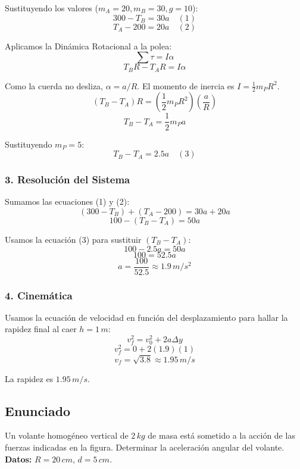 \documentclass[12pt, a4paper]{article}
\begin{document}
Sustituyendo los valores ($m_A=20, m_B=30, g=10$):
$$ 300 - T_B = 30 a \quad (1) $$
$$ T_A - 200 = 20 a \quad (2) $$

Aplicamos la Dinámica Rotacional a la polea:
$$ \sum \tau = I \alpha $$
$$ T_B R - T_A R = I \alpha $$

Como la cuerda no desliza, $\alpha = a/R$. El momento de inercia es $I = \frac{1}{2}m_P R^2$.
$$ (T_B - T_A) R = \left( \frac{1}{2} m_P R^2 \right) \left( \frac{a}{R} \right) $$
$$ T_B - T_A = \frac{1}{2} m_P a $$

Sustituyendo $m_P = 5$:
$$ T_B - T_A = 2.5 a \quad (3) $$

\subsubsection*{3. Resolución del Sistema}
Sumamos las ecuaciones (1) y (2):
$$ (300 - T_B) + (T_A - 200) = 30a + 20a $$
$$ 100 - (T_B - T_A) = 50a $$

Usamos la ecuación (3) para sustituir $(T_B - T_A)$:
$$ 100 - 2.5a = 50a $$
$$ 100 = 52.5 a $$
$$ a = \frac{100}{52.5} \approx 1.9 \, \si{m/s^2} $$

\subsubsection*{4. Cinemática}
Usamos la ecuación de velocidad en función del desplazamiento para hallar la rapidez final al caer $h = 1 \, \si{m}$:
$$ v_f^2 = v_0^2 + 2 a \Delta y $$
$$ v_f^2 = 0 + 2(1.9)(1) $$
$$ v_f = \sqrt{3.8} \approx 1.95 \, \si{m/s} $$

\begin{tcolorbox}[colback=green!5!white, colframe=green!50!black, title=Respuesta]
La rapidez es $1.95 \, \si{m/s}$.
\end{tcolorbox}

\newpage

\subsection*{Enunciado}
Un volante homogéneo vertical de $2 \, \si{kg}$ de masa está sometido a la acción de las fuerzas indicadas en la figura. Determinar la aceleración angular del volante. \\
\textbf{Datos:} $R = 20 \, \si{cm}$, $d = 5 \, \si{cm}$.
\end{document}
